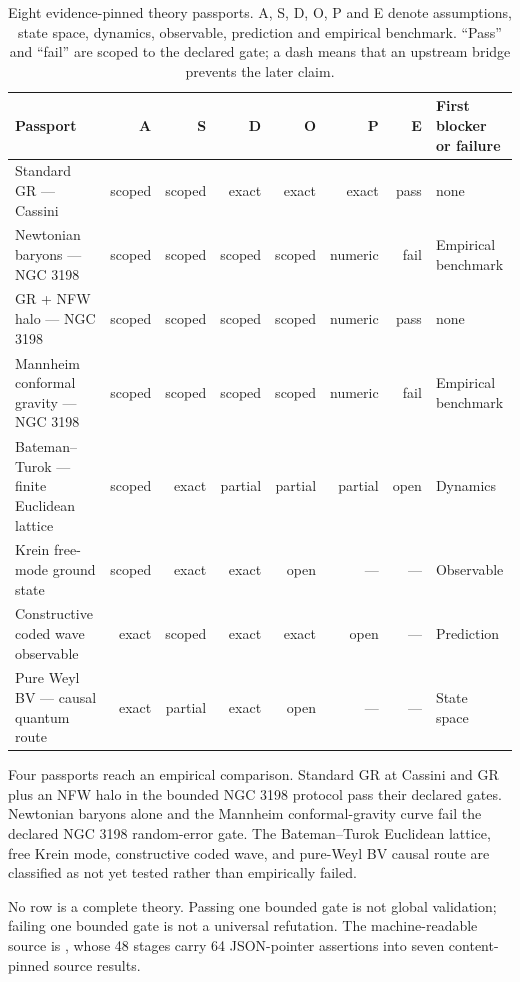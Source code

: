 \begin{table}[htbp]
\centering
\scriptsize
\setlength{\tabcolsep}{3pt}
\begin{tabularx}{\textwidth}{@{}Yrrrrrrp{0.19\textwidth}@{}}
\toprule
Passport & A & S & D & O & P & E & First blocker or failure \\
\midrule
Standard GR --- Cassini & scoped & scoped & exact & exact & exact & pass & none \\
Newtonian baryons --- NGC 3198 & scoped & scoped & scoped & scoped & numeric & fail & Empirical benchmark \\
GR + NFW halo --- NGC 3198 & scoped & scoped & scoped & scoped & numeric & pass & none \\
Mannheim conformal gravity --- NGC 3198 & scoped & scoped & scoped & scoped & numeric & fail & Empirical benchmark \\
Bateman--Turok --- finite Euclidean lattice & scoped & exact & partial & partial & partial & open & Dynamics \\
Krein free-mode ground state & scoped & exact & exact & open & --- & --- & Observable \\
Constructive coded wave observable & exact & scoped & exact & exact & open & --- & Prediction \\
Pure Weyl BV --- causal quantum route & exact & partial & exact & open & --- & --- & State space \\
\bottomrule
\end{tabularx}
\caption{Eight evidence-pinned theory passports.  A, S, D, O, P and E denote assumptions, state space, dynamics, observable, prediction and empirical benchmark.  ``Pass'' and ``fail'' are scoped to the declared gate; a dash means that an upstream bridge prevents the later claim.}
\label{tab:theory-passport-overview}
\end{table}

Four passports reach an empirical comparison.  Standard GR at Cassini and GR plus an NFW halo in the bounded NGC 3198 protocol pass their declared gates.  Newtonian baryons alone and the Mannheim conformal-gravity curve fail the declared NGC 3198 random-error gate.  The Bateman--Turok Euclidean lattice, free Krein mode, constructive coded wave, and pure-Weyl BV causal route are classified as not yet tested rather than empirically failed.

No row is a complete theory.  Passing one bounded gate is not global validation; failing one bounded gate is not a universal refutation.  The machine-readable source is , whose 48 stages carry 64 JSON-pointer assertions into seven content-pinned source results.

